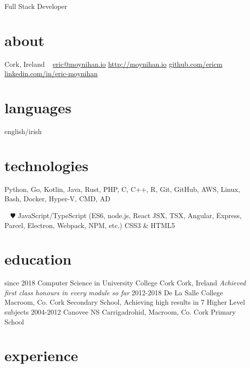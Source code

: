 \documentclass[]{friggeri-cv}
\begin{document}
       {Full Stack Developer}


\begin{aside}
  \section{about}
    Cork,
    Ireland
    ~
    \href{mailto:eric@moynihan.io}{eric@moynihan.io}
    \href{http://moynihan.io}{http://moynihan.io}
    \href{http://github.com/ericm}{github.com/ericm}
    \href{https://www.linkedin.com/in/eric-moynihan}{linkedin.com/in/eric-moynihan}
  \section{languages}
    english/irish
  \section{technologies}
    Python, Go, Kotlin,
    Java, Rust, PHP,
    C, C++, R,
    Git, GitHub, AWS,
    Linux, Bash, Docker,
    Hyper-V, CMD, AD
    
    ~
    {\color{red} $\varheartsuit$} JavaScript/TypeScript
    (ES6, node.js, React JSX, TSX, Angular, Express, Parcel, Electron, Webpack, NPM, etc.)
    CSS3 \& HTML5
    
\end{aside}



\section{education}

\begin{entrylist}
  \entry
    {since 2018}
    {Computer Science in {\normalfont University College Cork}}
    {Cork, Ireland}
    {\emph{Achieved first class honours in every module so far}}
  \entry
    {2012-2018}
    {De La Salle College}
    {Macroom, Co. Cork}
    {Secondary School, Achieving high results in 7 Higher Level subjects}
  \entry
    {2004-2012}
    {Canovee NS}
    {Carrigadrohid, Macroom, Co. Cork}
    {Primary School}
\end{entrylist}

\section{experience}
\end{document}
